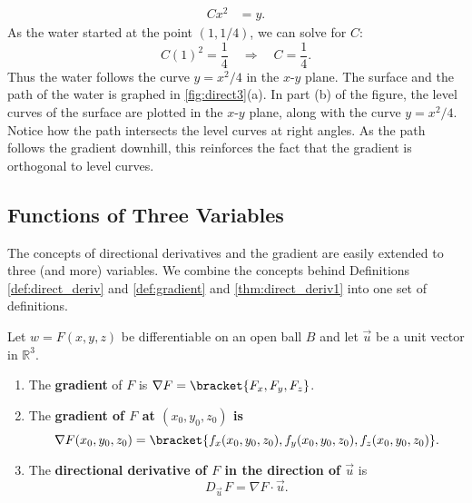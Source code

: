 {\begin{align*}
Cx^2 &= y.
\end{align*}
As the water started at the point $(1,1/4)$, we can solve for $C$:
$$C(1)^2 = \frac14 \quad \Rightarrow \quad C = \frac14.$$
Thus the water follows the curve $y=x^2/4$ in the $x$-$y$ plane. The surface and the path of the water is graphed in \autoref{fig:direct3}(a). In part (b) of the figure, the level curves of the surface are plotted in the $x$-$y$ plane, along with the curve $y=x^2/4$. Notice how the path intersects the level curves at right angles. As the path follows the gradient downhill, this reinforces the fact that the gradient is orthogonal to level curves.}

\subsection*{Functions of Three Variables}

The concepts of directional derivatives and the gradient are easily extended to three (and more) variables. We combine the concepts behind Definitions \ref{def:direct_deriv} and \ref{def:gradient} and \autoref{thm:direct_deriv1} into one set of definitions.

{Let $w=F(x,y,z)$ be differentiable on an open ball $B$ and let $\vec u $ be a unit vector in $\mathbb{R}^3$.
\begin{enumerate}
	\item	The \textbf{gradient} of $F$ is $\nabla F =\bracket{F_x,F_y,F_z}$.
	\item The \textbf{gradient of $F$ at $(x_0,y_0,z_0)$ is $$\nabla F(x_0,y_0,z_0) =\bracket{f_x(x_0,y_0,z_0),f_y(x_0,y_0,z_0),f_z(x_0,y_0,z_0)}.$$}
	\item The \textbf{directional derivative of $F$ in the direction of $\vec u$} is $$D_{\vec u\,}F=\nabla F\cdot \vec u.$$
\end{enumerate}
}

